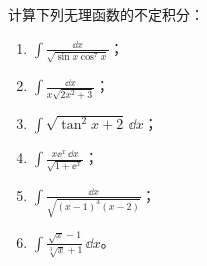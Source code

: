 \begin{xexercise}[5]
计算下列无理函数的不定积分：
  \begin{enumerate}[label=(\arabic*)]
    \item $\displaystyle\int\frac{\dd x}{\sqrt{\sin x\cos^7x}}$；
    \item $\displaystyle\int\frac{\dd x}{x\sqrt{2x^2+3}}$；
    \item $\displaystyle\int\sqrt{\tan^2x+2}\,\dd x$；
    \item $\displaystyle\int\frac{x\ee^x\,\dd x}{\sqrt{1+\ee^x}}$；
    \item $\displaystyle\int\frac{\dd x}{\sqrt{(x-1)^3(x-2)}}$；
    \item $\displaystyle\int\frac{\sqrt{x}-1}{\sqrt[3]{x}+1}\,\dd x$。
  \end{enumerate}
\end{xexercise}
